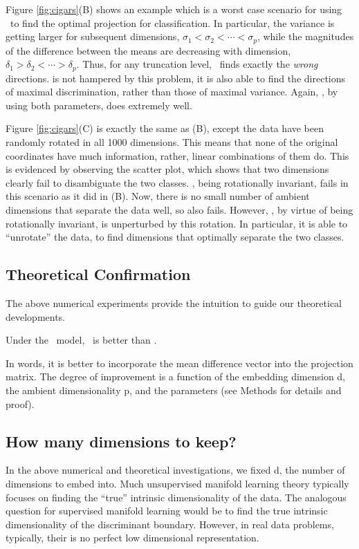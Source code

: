 \documentclass[10pt]{article}
\begin{document}
Figure \ref{fig:cigars}(B) shows an example which is a worst case scenario for using \Pca~to find the optimal projection for classification.  
In particular, the variance is getting larger for subsequent dimensions, $\sigma_1 < \sigma_2 < \cdots < \sigma_p$, while the magnitudes of the difference between the means are decreasing with dimension, $\delta_1 > \delta_2 < \cdots > \delta_p$. 
Thus, for any truncation level,  \Pca~finds exactly the \emph{wrong} directions.  
 is not hampered by this problem, it is also able to find the directions of maximal discrimination, rather than those of maximal variance.
Again, \Lol, by using both parameters, does extremely well.


Figure \ref{fig:cigars}(C) is exactly the same as (B), except the data have been randomly rotated in all 1000 dimensions.  This means that none of the original coordinates have much information, rather, linear combinations of them do.  
This is evidenced by observing the scatter plot, which shows that two dimensions clearly fail to disambiguate the two classes.
\Pca, being rotationally invariant, fails in this scenario as it did in (B).
Now, there is no small number of ambient dimensions that separate the data well, so  also fails.
However, \Lol, by virtue of being rotationally invariant, is unperturbed by this rotation.  In particular, it is able to ``unrotate'' the data, to find dimensions that optimally separate the two classes.  


\subsection*{Theoretical Confirmation}

The above numerical experiments provide the intuition to guide our theoretical developments.  
\begin{thm} \label{thm:LDA}
Under the \Lda~model, \Lol~is better than \Pca.
\end{thm}
In words, it is better to incorporate the mean difference vector into the projection matrix.  The degree of improvement is a function of the embedding dimension d, the ambient dimensionality p, and the parameters (see Methods for details and proof).



\subsection*{How many dimensions to keep?}

In the above numerical and theoretical investigations, we fixed d, the number of dimensions to embed into.  Much unsupervised manifold learning theory typically focuses on finding the ``true'' intrinsic dimensionality of the data.   The analogous question for supervised manifold learning would be to find the true intrinsic dimensionality of the discriminant boundary.  However, in real data problems, typically, their is no perfect low dimensional representation.
\end{document}
